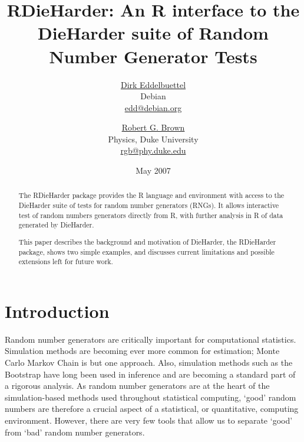 \documentclass[12pt]{article}
\newcommand{\pkg}[1]{{\normalfont\fontseries{b}\selectfont #1}}
\begin{document}



\title{\pkg{RDieHarder}: An R interface to the DieHarder suite of Random
  Number Generator Tests}
\author{\href{http://dirk.eddelbuettel.com}{Dirk Eddelbuettel} \\ 
  Debian \\ \url{edd@debian.org} 
  \and
  \href{http://www.phy.duke.edu/~rgb}{Robert G. Brown} \\ 
  Physics, Duke University \\ \url{rgb@phy.duke.edu} }
\date{May 2007}

\maketitle

\begin{abstract}
  \noindent The \pkg{RDieHarder} package provides the R language and
  environment with access to the DieHarder suite of tests for random number
  generators (RNGs).  It allows interactive test of random numbers generators
  directly from R, with further analysis in R of data generated by DieHarder.

  This paper describes the background and motivation of DieHarder, the
  RDieHarder package, shows two simple examples, and discusses current
  limitations and possible extensions left for future work.
\end{abstract}

\section{Introduction}

Random number generators are critically important for computational
statistics.  Simulation methods are becoming ever more common for estimation;
Monte Carlo Markov Chain is but one approach. Also, simulation methods such
as the Bootstrap have long been used in inference and are becoming a standard
part of a rigorous analysis.  As random number generators are at the heart of 
the simulation-based methods used throughout statistical computing, `good'
random numbers are therefore a crucial aspect of a statistical, or
quantitative, computing environment.  However, there are very few tools that
allow us to separate `good' from `bad' random number generators.
\end{document}
